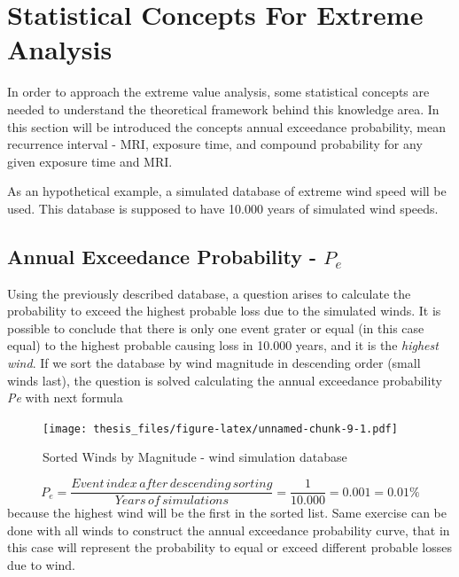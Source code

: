 \documentclass[12pt,oneside]{reedthesis}
\begin{document}
\hypertarget{statistical-concepts-for-extreme-analysis}{%
\section{Statistical Concepts For Extreme Analysis}\label{statistical-concepts-for-extreme-analysis}}

In order to approach the extreme value analysis, some statistical concepts are needed to understand the theoretical framework behind this knowledge area. In this section will be introduced the concepts annual exceedance probability, mean recurrence interval - MRI, exposure time, and compound probability for any given exposure time and MRI.

As an hypothetical example, a simulated database of extreme wind speed will be used. This database is supposed to have 10.000 years of simulated wind speeds.

\hypertarget{annual-exceedance-probability---p_e}{%
\subsection{\texorpdfstring{Annual Exceedance Probability - \(P_e\)}{Annual Exceedance Probability - P\_e}}\label{annual-exceedance-probability---p_e}}

Using the previously described database, a question arises to calculate the probability to exceed the highest probable loss due to the simulated winds. It is possible to conclude that there is only one event grater or equal (in this case equal) to the highest probable causing loss in 10.000 years, and it is the \emph{highest wind}. If we sort the database by wind magnitude in descending order (small winds last), the question is solved calculating the annual exceedance probability \emph{Pe} with next formula

\footnotesize
\begin{figure}
\centering
\texttt{[image: thesis\_files/figure-latex/unnamed-chunk-9-1.pdf]}
\caption{\label{fig:unnamed-chunk-9}Sorted Winds by Magnitude - wind simulation database}
\end{figure}
\normalsize

\[
P_e = \frac{Event\,index\,after\,descending\,sorting}{Years\,of\,simulations } = \frac{1}{10.000}=0.001=0.01\%
\]
because the highest wind will be the first in the sorted list. Same exercise can be done with all winds to construct the annual exceedance probability curve, that in this case will represent the probability to equal or exceed different probable losses due to wind.
\end{document}
